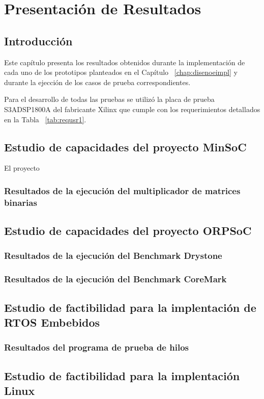 \chapter{Presentación de Resultados}
	\section{Introducción} 
	Este capítulo presenta los resultados obtenidos durante la implementación de cada uno de los prototipos planteados en el Capítulo
	~\ref{chap:disenoeimpl} y durante la ejección de los casos de prueba correspondientes. 
	
	Para el desarrollo de todas las pruebas se utilizó la placa de prueba S3ADSP1800A del fabricante Xilinx que cumple con los requerimientos detallados
	en la Tabla ~\ref{tab:requsr1}. 
	
	\section{Estudio de capacidades del proyecto MinSoC}
	El proyecto 

		\subsection{Resultados de la ejecución del multiplicador de matrices binarias}
	

	

	\section{Estudio de capacidades del proyecto ORPSoC}

		\subsection{Resultados de la ejecución del Benchmark Drystone}

		
		\subsection{Resultados de la ejecución del Benchmark CoreMark}
		
	
	\section{Estudio de factibilidad para la implentación de RTOS Embebidos}
	
		\subsection{Resultados del programa de prueba de hilos}
		
			
		
	\section{Estudio de factibilidad para la implentación Linux}
	
	
	 